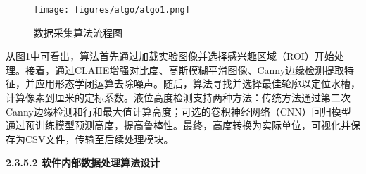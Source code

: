 \documentclass[UTF8,a4paper,fontset=none]{ctexart}
\newcommand{\wuhao}{\fontsize{10.5pt}{15pt}\selectfont}       %
\begin{document}
\begin{figure}[H]
    \centering
    \texttt{[image: figures/algo/algo1.png]}
    \caption{数据采集算法流程图}
    \label{fig:algo1}
\end{figure}

从图\ref{fig:algo1}中可看出，算法首先通过加载实验图像并选择感兴趣区域（ROI）开始处理。接着，通过CLAHE增强对比度、高斯模糊平滑图像、Canny边缘检测提取特征，并应用形态学闭运算去除噪声。随后，算法寻找并选择最佳轮廓以定位水槽，计算像素到厘米的定标系数。液位高度检测支持两种方法：传统方法通过第二次Canny边缘检测和行和最大值计算高度；可选的卷积神经网络（CNN）回归模型通过预训练模型预测高度，提高鲁棒性。最终，高度转换为实际单位，可视化并保存为CSV文件，传输至后续处理模块。

{\noindent \wuhao \rmfamily {} \textbf{2.3.5.2 \quad 软件内部数据处理算法设计}}
\end{document}
